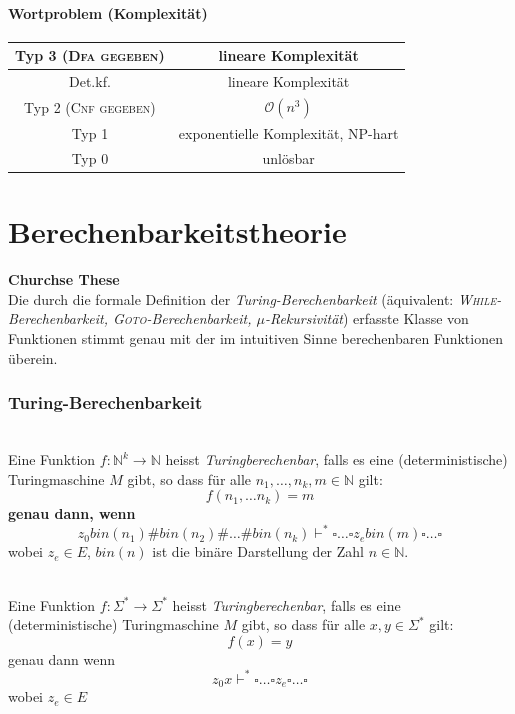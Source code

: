 \documentclass{scrartcl}
\begin{document}
\subsection*{Wortproblem (Komplexität)}
\begin{tabular}{c|c}
\hline
Typ 3 (\textsc{Dfa gegeben}) & lineare Komplexität \\
\hline
Det.kf. & lineare Komplexität \\
\hline
Typ 2 (\textsc{Cnf gegeben}) & $\mathcal{O}(n^3)$ \\
\hline
Typ 1 & exponentielle Komplexität, NP-hart \\
\hline
Typ 0 & unlösbar \\
\hline
\end{tabular}

\part*{Berechenbarkeitstheorie}
\begin{shaded}
    \textbf{Churchse These} \\
    Die durch die formale Definition der \emph{Turing-Berechenbarkeit} (äquivalent: \emph{\textsc{While}-Berechenbarkeit, \textsc{Goto}-Berechenbarkeit, $\mu$-Rekursivität}) erfasste Klasse von Funktionen stimmt genau mit der im intuitiven Sinne berechenbaren Funktionen überein.
\end{shaded}

\section*{Turing-Berechenbarkeit}
\begin{shaded}
    \ \\Eine Funktion $f:\mathds{N}^k\to \mathds{N}$ heisst \emph{Turingberechenbar}, falls es eine (deterministische) Turingmaschine $M$ gibt, so dass für alle $n_1,\dots,n_k,m\in \mathds{N}$ gilt:
    \[ f(n_1,\dots n_k) = m \] \textbf{genau dann, wenn} \[ z_0 bin(n_1)\#bin(n_2)\#\dots\#bin(n_k)\vdash^* \square\dots\square z_e bin(m)\square\dots\square \] wobei $z_e\in E$, $bin(n)$ ist die binäre Darstellung der Zahl $n\in \mathds{N}$.
\end{shaded}
\begin{shaded}
    \ \\Eine Funktion $f:\Sigma^*\to\Sigma^*$ heisst \emph{Turingberechenbar}, falls es eine (deterministische) Turingmaschine $M$ gibt, so dass für alle $x,y\in\Sigma^*$ gilt:
    \[ f(x)=y \] genau dann wenn \[ z_0x\vdash^*\square\dots\square z_e\square\dots\square\] wobei $z_e\in E$
\end{shaded}
\end{document}
